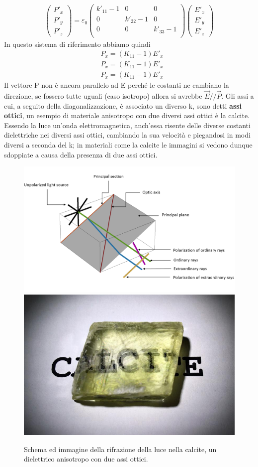 \documentclass[10pt,a4paper]{article}
\begin{document}
\begin{align*}
	\begin{pmatrix}
		P'_x\\
		P'_y\\
		P'_z
	\end{pmatrix}
	=\varepsilon_0
	\begin{pmatrix}
		k'_{11}-1&0&0\\
		0&k'_{22}-1&0\\
		0&0&k'_{33}-1\\
	\end{pmatrix}
	\begin{pmatrix}
		E'_x\\
		E'_y\\
		E'_z
	\end{pmatrix}
\end{align*}
In questo sistema di riferimento abbiamo quindi
\begin{align*}
	&P_x =(K_{11}-1)E'_x\\
	&P_x =(K_{11}-1)E'_x\\
	&P_x =(K_{11}-1)E'_x
\end{align*}
Il vettore P non è ancora parallelo ad E perché le costanti ne cambiano la direzione, se fossero tutte uguali (caso isotropo) allora si avrebbe \(\vec{E}//\vec{P}\). Gli assi a cui, a seguito della diagonalizzazione, è associato un diverso k, sono detti \textbf{assi ottici}, un esempio di materiale anisotropo con due diversi assi ottici è la calcite. Essendo la luce un'onda elettromagnetica, anch'essa risente delle diverse costanti dielettriche nei diversi assi ottici, cambiando la sua velocità e piegandosi in modi diversi a seconda del k; in materiali come la calcite le immagini si vedono dunque sdoppiate a causa della presenza di due assi ottici.
\begin{figure}[h!]
	\centering
	\includegraphics[width=0.6\linewidth]{images/calcite1}\quad
	\includegraphics[width=0.4\linewidth]{images/calcite2}
	\caption{Schema ed immagine della rifrazione della luce nella calcite, un dielettrico anisotropo con due assi ottici.}
	\label{fig:calcite1}
\end{figure}
\FloatBarrier
\end{document}
